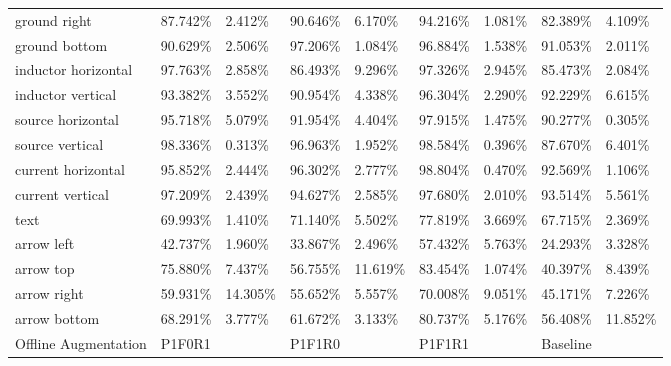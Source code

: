 \begin{table}[H]
\begin{center}
\begin{tabular}{|l|l|l|l|l|l|l|l|l|}
\rowcolor{lightgray!50}
ground right                    & 87.742\% & 2.412\%  & 90.646\% & 6.170\%  & 94.216\% & 1.081\% & 82.389\% & 4.109\%    \\
ground bottom                   & 90.629\% & 2.506\%  & 97.206\% & 1.084\%  & 96.884\% & 1.538\% & 91.053\% & 2.011\%    \\
\rowcolor{lightgray!50}
inductor horizontal             & 97.763\% & 2.858\%  & 86.493\% & 9.296\%  & 97.326\% & 2.945\% & 85.473\% & 2.084\%    \\
inductor vertical               & 93.382\% & 3.552\%  & 90.954\% & 4.338\%  & 96.304\% & 2.290\% & 92.229\% & 6.615\%    \\
\rowcolor{lightgray!50}
source horizontal               & 95.718\% & 5.079\%  & 91.954\% & 4.404\%  & 97.915\% & 1.475\% & 90.277\% & 0.305\%    \\
source vertical                 & 98.336\% & 0.313\%  & 96.963\% & 1.952\%  & 98.584\% & 0.396\% & 87.670\% & 6.401\%    \\
\rowcolor{lightgray!50}
current horizontal              & 95.852\% & 2.444\%  & 96.302\% & 2.777\%  & 98.804\% & 0.470\% & 92.569\% & 1.106\%    \\
current vertical                & 97.209\% & 2.439\%  & 94.627\% & 2.585\%  & 97.680\% & 2.010\% & 93.514\% & 5.561\%    \\
\rowcolor{lightgray!50}
text                            & 69.993\% & 1.410\%  & 71.140\% & 5.502\%  & 77.819\% & 3.669\% & 67.715\% & 2.369\%    \\
arrow left                      & 42.737\% & 1.960\%  & 33.867\% & 2.496\%  & 57.432\% & 5.763\% & 24.293\% & 3.328\%    \\
\rowcolor{lightgray!50}
arrow top                       & 75.880\% & 7.437\%  & 56.755\% & 11.619\% & 83.454\% & 1.074\% & 40.397\% & 8.439\%    \\
arrow right                     & 59.931\% & 14.305\% & 55.652\% & 5.557\%  & 70.008\% & 9.051\% & 45.171\% & 7.226\%    \\
\rowcolor{lightgray!50}
arrow bottom                    & 68.291\% & 3.777\%  & 61.672\% & 3.133\%  & 80.737\% & 5.176\% & 56.408\% & 11.852\%   \\
\hline
\hline
Offline Augmentation            & P1F0R1   &          & P1F1R0   &          & P1F1R1   &           & Baseline &          \\

\end{tabular}
\end{center}
\end{table}
